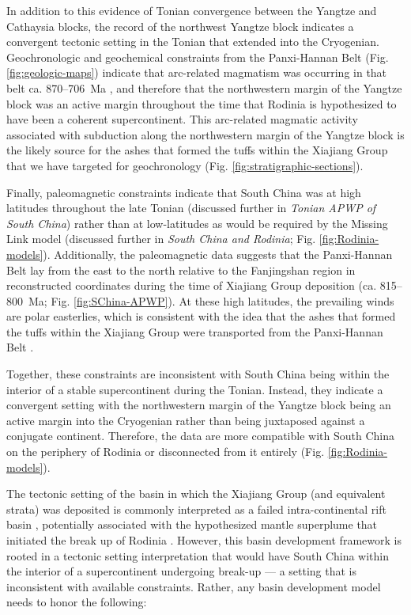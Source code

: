 In addition to this evidence of Tonian convergence between the Yangtze and Cathaysia blocks, the record of the northwest Yangtze block indicates a convergent tectonic setting in the Tonian that extended into the Cryogenian. Geochronologic and geochemical constraints from the Panxi-Hannan Belt (Fig. \ref{fig:geologic-maps}) indicate that arc-related magmatism was occurring in that belt ca. 870--706~Ma \citep{Dong2012a}, and therefore that the northwestern margin of the Yangtze block was an active margin throughout the time that Rodinia is hypothesized to have been a coherent supercontinent. This arc-related magmatic activity associated with subduction along the northwestern margin of the Yangtze block is the likely source for the ashes that formed the tuffs within the Xiajiang Group that we have targeted for geochronology (Fig. \ref{fig:stratigraphic-sections}).

Finally, paleomagnetic constraints indicate that South China was at high latitudes throughout the late Tonian (discussed further in \textit{Tonian APWP of South China}) rather than at low-latitudes as would be required by the Missing Link model (discussed further in \textit{South China and Rodinia}; Fig. \ref{fig:Rodinia-models}). Additionally, the paleomagnetic data suggests that the Panxi-Hannan Belt lay from the east to the north relative to the Fanjingshan region in reconstructed coordinates during the time of Xiajiang Group deposition (ca. 815--800~Ma; Fig. \ref{fig:SChina-APWP}). At these high latitudes, the prevailing winds are polar easterlies, which is consistent with the idea that the ashes that formed the tuffs within the Xiajiang Group were transported from the Panxi-Hannan Belt \citep{Hildebrand1988a}.

Together, these constraints are inconsistent with South China being within the interior of a stable supercontinent during the Tonian. Instead, they indicate a convergent setting with the northwestern margin of the Yangtze block being an active margin into the Cryogenian rather than being juxtaposed against a conjugate continent. Therefore, the data are more compatible with South China on the periphery of Rodinia or disconnected from it entirely (Fig. \ref{fig:Rodinia-models}).

The tectonic setting of the basin in which the Xiajiang Group (and equivalent strata) was deposited is commonly interpreted as a failed intra-continental rift basin \citep{Zhang2019c}, potentially associated with the hypothesized mantle superplume that initiated the break up of Rodinia \citep{Li2003a, Li2009b}. However, this basin development framework is rooted in a tectonic setting interpretation that would have South China within the interior of a supercontinent undergoing break-up --- a setting that is inconsistent with available constraints. Rather, any basin development model needs to honor the following:

